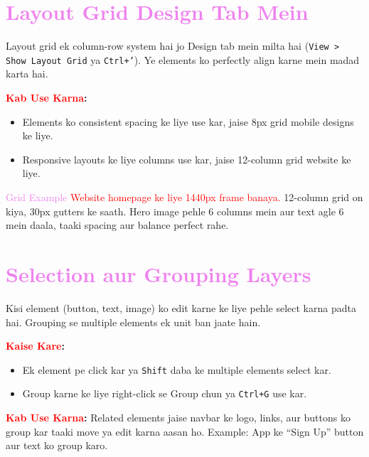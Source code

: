 \documentclass[a4paper]{article}
\begin{document}
\section*{\textbf{\LARGE \textcolor{violet}{Layout Grid Design Tab Mein}}}
\textcolor{warningred}{Layout grid ek column-row system hai jo Design tab mein milta hai (\texttt{View > Show Layout Grid} ya \texttt{Ctrl+’}).} Ye elements ko perfectly align karne mein madad karta hai.

\textbf{\textcolor{red}{Kab Use Karna}:}
\begin{itemize}
  \item \textcolor{examplegreen}{Elements ko consistent spacing ke liye use kar, jaise 8px grid mobile designs ke liye.}
  \item \textcolor{examplegreen}{Responsive layouts ke liye columns use kar, jaise 12-column grid website ke liye.}
\end{itemize}

\begin{examplebox}{\textcolor{violet}{Grid Example}}
\textcolor{red}{Website homepage ke liye 1440px frame banaya.} 12-column grid on kiya, 30px gutters ke saath. \textcolor{examplegreen}{Hero image pehle 6 columns mein aur text agle 6 mein daala, taaki spacing aur balance perfect rahe.}
\end{examplebox}

\section*{\textbf{\LARGE \textcolor{violet}{Selection aur Grouping Layers}}}
\textcolor{warningred}{Kisi element (button, text, image) ko edit karne ke liye pehle select karna padta hai.} Grouping se multiple elements ek unit ban jaate hain.

\textbf{\textcolor{red}{Kaise Kare}:}
\begin{itemize}
  \item \textcolor{examplegreen}{Ek element pe click kar ya \texttt{Shift} daba ke multiple elements select kar.}
  \item \textcolor{examplegreen}{Group karne ke liye right-click se Group chun ya \texttt{Ctrl+G} use kar.}
\end{itemize}

\textbf{\textcolor{red}{Kab Use Karna}:}
\textcolor{examplegreen}{Related elements jaise navbar ke logo, links, aur buttons ko group kar taaki move ya edit karna aasan ho.} Example: App ke “Sign Up” button aur text ko group karo.
\end{document}
